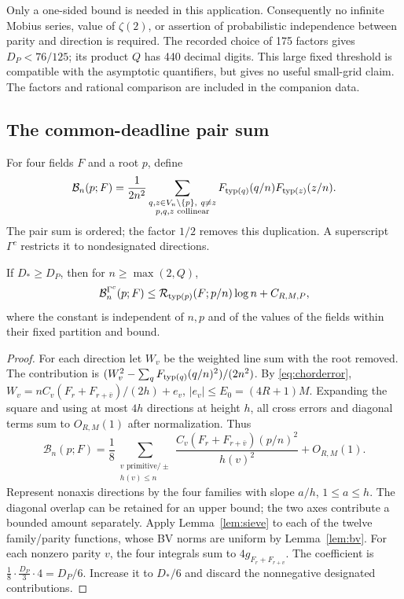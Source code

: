Only a one-sided bound is needed in this application. Consequently
no infinite Mobius series, value of \(\zeta(2)\), or assertion of
probabilistic independence between parity and direction is required.
The recorded choice of 175 factors gives \(D_P<76/125\); its product
\(Q\) has 440 decimal digits. This large fixed threshold is compatible
with the asymptotic quantifiers, but gives no useful small-grid claim.
The factors and rational comparison are included in the companion data.

\subsection{The common-deadline pair sum}
For four fields \(F\) and a root \(p\), define
\begin{equation}\label{eq:pairsum}
 \mathcal B_n(p;F)=\frac1{2n^2}
 \sum_{\substack{q,z\in V_n\setminus\{p\},\ q\ne z\\p,q,z\text{ collinear}}}
 F_{\operatorname{typ}(q)}(q/n)F_{\operatorname{typ}(z)}(z/n).
\end{equation}
The pair sum is ordered; the factor \(1/2\) removes this duplication.
A superscript \(\Gamma^c\) restricts it to nondesignated directions.

\begin{proposition}\label{prop:pair}
If \(D_*\ge D_P\), then for \(n\ge\max(2,Q)\),
\[
 \mathcal B_n^{\Gamma^c}(p;F)
 \le\mathcal R_{\operatorname{typ}(p)}(F;p/n)\log n+C_{R,M,P},
\]
where the constant is independent of \(n,p\) and of the values of the
fields within their fixed partition and bound.
\end{proposition}
\begin{proof}
For each direction let \(W_v\) be the weighted line sum with the root
removed. The contribution is
\((W_v^2-\sum_qF_{\operatorname{typ}(q)}(q/n)^2)/(2n^2)\).
By \eqref{eq:chorderror},
\(W_v=nC_v(F_r+F_{r+\bar v})/(2h)+e_v\),
\(|e_v|\le E_0=(4R+1)M\). Expanding the square and using
at most \(4h\) directions at height \(h\), all cross errors and
diagonal terms sum to \(O_{R,M}(1)\) after normalization. Thus
\[
 \mathcal B_n(p;F)=\frac18\sum_{\substack{v\text{ primitive}/\pm\\h(v)\le n}}
 \frac{C_v(F_r+F_{r+\bar v})(p/n)^2}{h(v)^2}+O_{R,M}(1).
\]
Represent nonaxis directions by the four families with slope
\(a/h\), \(1\le a\le h\). The diagonal overlap can be retained for
an upper bound; the two axes contribute a bounded amount separately.
Apply Lemma~\ref{lem:sieve} to each of the twelve family/parity
functions, whose BV norms are uniform by Lemma~\ref{lem:bv}.
For each nonzero parity \(v\), the four integrals sum to
\(4g_{F_r+F_{r+v}}\). The coefficient is
\(\tfrac18\cdot\tfrac{D_P}{3}\cdot4=D_P/6\).
Increase it to \(D_*/6\) and discard the nonnegative designated
contributions.
\end{proof}

